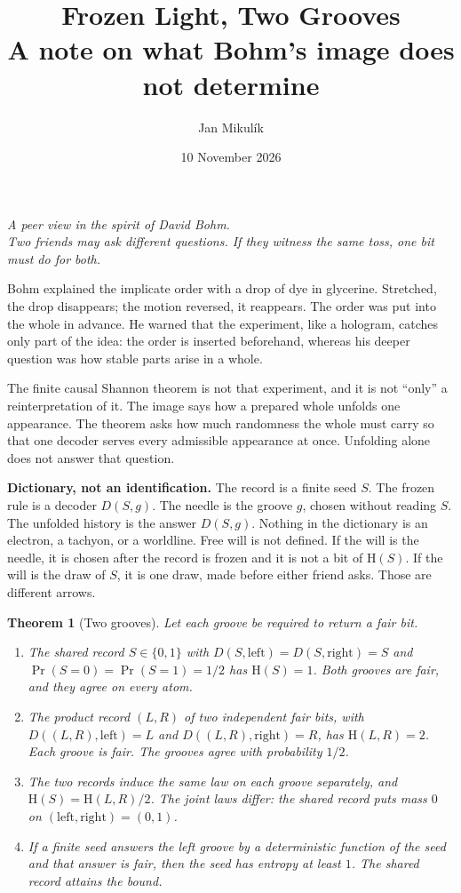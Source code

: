 \documentclass[11pt]{article}
\title{Frozen Light, Two Grooves\\[4pt]\large A note on what Bohm's image does not determine}
\author{Jan Mikul\'ik}
\date{10 November 2026}
\newtheorem{theorem}{Theorem}
\theoremstyle{remark}\newtheorem{remark}[theorem]{Remark}
\newcommand{\HH}{\mathrm H}
\begin{document}
\maketitle

\begin{center}
\emph{A peer view in the spirit of David Bohm.\\
Two friends may ask different questions.
If they witness the same toss, one bit must do for both.}
\end{center}

\medskip
Bohm explained the implicate order with a drop of dye in glycerine.
Stretched, the drop disappears; the motion reversed, it reappears.
The order was put into the whole in advance. He warned that the experiment,
like a hologram, catches only part of the idea: the order is inserted beforehand,
whereas his deeper question was how stable parts arise in a whole.

The finite causal Shannon theorem is not that experiment, and it is not
``only'' a reinterpretation of it. The image says how a prepared whole
unfolds one appearance. The theorem asks how much randomness the whole must
carry so that one decoder serves every admissible appearance at once.
Unfolding alone does not answer that question.

\medskip
\noindent
\textbf{Dictionary, not an identification.}
The record is a finite seed $S$. The frozen rule is a decoder $D(S,g)$.
The needle is the groove $g$, chosen without reading $S$.
The unfolded history is the answer $D(S,g)$.
Nothing in the dictionary is an electron, a tachyon, or a worldline.
Free will is not defined. If the will is the needle, it is chosen after the
record is frozen and it is not a bit of $\HH(S)$. If the will is the draw of
$S$, it is one draw, made before either friend asks. Those are different arrows.

\begin{theorem}[Two grooves]
\label{thm:grooves}
Let each groove be required to return a fair bit.
\begin{enumerate}
\item The shared record $S\in\{0,1\}$ with $D(S,\mathrm{left})=D(S,\mathrm{right})=S$
and $\Pr(S=0)=\Pr(S=1)=1/2$ has $\HH(S)=1$.
Both grooves are fair, and they agree on every atom.
\item The product record $(L,R)$ of two independent fair bits, with
$D((L,R),\mathrm{left})=L$ and $D((L,R),\mathrm{right})=R$, has
$\HH(L,R)=2$. Each groove is fair. The grooves agree with probability $1/2$.
\item The two records induce the same law on each groove separately,
and $\HH(S)=\HH(L,R)/2$. The joint laws differ:
the shared record puts mass $0$ on $(\mathrm{left},\mathrm{right})=(0,1)$.
\item If a finite seed answers the left groove by a deterministic function
of the seed and that answer is fair, then the seed has entropy at least $1$.
The shared record attains the bound.
\end{enumerate}
\end{theorem}
\end{document}
